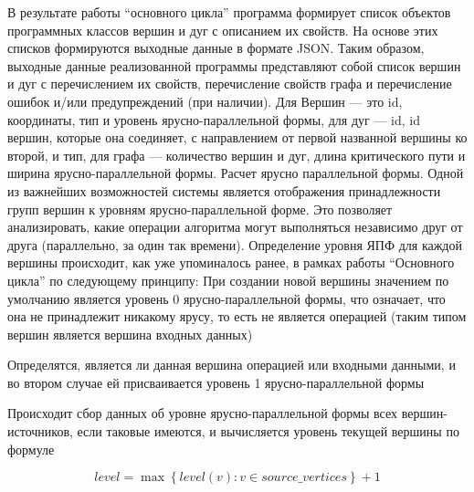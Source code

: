 В результате работы “основного цикла” программа формирует список объектов программных классов вершин и дуг с описанием их свойств. На основе этих списков формируются выходные данные в формате JSON. Таким образом, выходные данные реализованной программы представляют собой список вершин и дуг с перечислением их свойств, перечисление свойств графа и перечисление ошибок и/или предупреждений (при наличии). Для Вершин — это id, координаты, тип и уровень ярусно-параллельной формы, для дуг — id, id вершин, которые она соединяет, с направлением от первой названной вершины ко второй, и тип, для графа — количество вершин и дуг, длина критического пути и ширина ярусно-параллельной формы.
Расчет ярусно параллельной формы.
Одной из важнейших возможностей системы является отображения принадлежности групп вершин к уровням ярусно-параллельной форме. Это позволяет анализировать, какие операции алгоритма могут выполняться независимо друг от друга (параллельно, за один так времени). Определение уровня ЯПФ для каждой вершины происходит, как уже упоминалось ранее, в рамках работы “Основного цикла” по следующему принципу:
При создании новой вершины значением по умолчанию является уровень 0 ярусно-параллельной формы, что означает, что она не принадлежит никакому ярусу, то есть не является операцией (таким типом вершин является вершина входных данных)


Определятся, является ли данная вершина операцией или входными данными, и во втором случае ей присваивается уровень 1 ярусно-параллельной формы


Происходит сбор данных об уровне ярусно-параллельной формы всех вершин-источников, если таковые имеются, и вычисляется уровень текущей вершины по формуле

 $$ level = \max\left\{level(v): v \in source\_vertices\right\} + 1 $$



